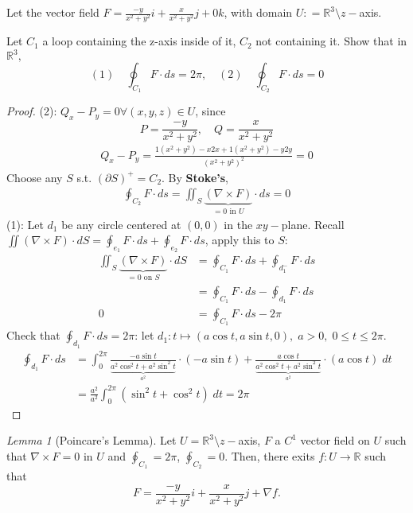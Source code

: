 \documentclass[12pt]{book}
\theoremstyle{definition}
\theoremstyle{remark}
\newtheorem{lemma}[theorem]{Lemma}
\begin{document}
\begin{example}Let the vector field $F = \frac{-y}{x^2+ y^2}i + \frac{x}{x^2 + y^2 }j + 0 k$, with domain $U : = \mathbb{R}^3\setminus z-$axis. 

Let $C_1$ a loop containing the z-axis inside of it, $C_2$ not containing it. Show that in $\mathbb{R}^3,$
  $$(1) \quad \oint_{C_1} F \cdot {ds}  = 2\pi, \quad (2) \quad \oint_{C_2} F \cdot {ds} = 0 $$
  \begin{proof} 
    (2): $Q_x - P_y = 0 \forall (x,y,z) \in U$, since 
    $$P = \frac{-y}{x^2 + y^2} , \quad Q = \frac{x }{x^2 + y^2}  $$
    \begin{equation*}
      \begin{split}
        Q_x - P_y = \frac{1(x^2 + y^2 )- x2x + 1(x^2 + y^2)-y 2y}{(x^2 + y^2 )^2} = 0 
      \end{split}
    \end{equation*}
Choose any $S$ s.t. $(\partial S)^+ = C_2$. By \textbf{Stoke's}, 
    \begin{equation*}
      \begin{split}
        \oint_{C_2} F \cdot {ds} = \iint_S \underbrace{( \nabla \times F)}_{= 0 \text{ in }U} \cdot ds = 0
      \end{split}
    \end{equation*}
    (1): Let $d_1$ be any circle centered at $(0,0)$ in the $xy-$plane. Recall $\iint (\nabla \times F) \cdot {dS} = \oint_{e_1} F \cdot {ds} + \oint_{e_2} F \cdot {ds}$, apply this to $S$:
    \begin{equation*}
      \begin{split}
        \iint_S \underbrace{( \nabla \times F )}_{=0 \text{ on }S}\cdot {dS} &= \oint_{C_1} F \cdot {ds} + \oint_{d^-_1}F \cdot {ds} \\ 
        &= \oint_{C_1} F \cdot {ds}- \oint_{d_1} F \cdot {ds} \\ 
        0 &= \oint_{C_1} F \cdot {ds}- 2 \pi 
      \end{split}
    \end{equation*}
    Check that $\oint_{d_1} F \cdot {ds} = 2 \pi$: let $d_1 : t\mapsto (a \cos t , a \sin t , 0), \; a > 0 , \; 0 \leq t \leq 2 \pi$. 
    \begin{equation*}
      \begin{split}
        \oint_{d_1} F \cdot {ds} &= \int_0^{2\pi} \frac{-a\sin t}{\underbrace{a^2 \cos^2 t + a^2 \sin^2 t }_{a^2} } \cdot {(-a \sin t) + \frac{a \cos t}{\underbrace{a^2 \cos^2 t + a^2 \sin^2 t }_{a^2}} }\cdot {(a\cos t)} \;dt \\ 
        &= \frac{a^2 }{a^2} \int_0 ^{2 \pi} (\sin^2 t + \cos^2 t) \; dt = 2\pi  
      \end{split}
    \end{equation*}
  \end{proof}
\end{example}
\begin{lemma}[Poincare's Lemma]\label{poincare} Let $U = \mathbb{R}^3 \setminus z-$axis, $F$ a $C^1$ vector field on $U$ such that $\nabla \times F = 0$ in $U$ and $\oint_{C_1} = 2 \pi$, $\oint_{C_2} = 0$. Then, there exits $f: U \to \mathbb{R}$ such that $$F = \frac{-y}{x^2 + y^2}i + \frac{x}{x^2 + y^2} j + \nabla f.$$ 
\end{lemma}
\end{document}
